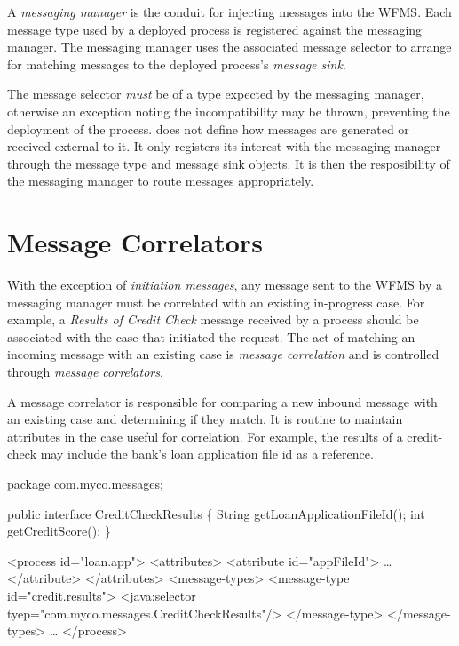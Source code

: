 A \emph{messaging manager} is the conduit for injecting
messages into the WFMS.  Each message type used by a deployed
process is registered against the messaging manager.  The
messaging manager uses the associated message selector to
arrange for matching messages to the deployed process's
\emph{message sink}.

The message selector \emph{must} be of a type expected
by the messaging manager, otherwise an exception noting the
incompatibility may be thrown, preventing the deployment
of the process.  {\werkflow} does not define how messages
are generated or received external to it.  It only registers
its interest with the messaging manager through the message
type and message sink objects.  It is then the resposibility
of the messaging manager to route messages appropriately.

\section{Message Correlators}

With the exception of \emph{initiation messages}, 
any message sent to the WFMS by a messaging manager must
be correlated with an existing in-progress case.  For example,
a \emph{Results of Credit Check} message received
by a process should be associated with the case that initiated
the request.  The act of matching an incoming message with
an existing case is \emph{message correlation} and is
controlled through \emph{message correlators}.

A message correlator is responsible for comparing a new
inbound message with an existing case and determining if
they match.  It is routine to maintain attributes in the
case useful for correlation.  For example, the results of
a credit-check may include the bank's loan application file 
id as a reference.  

\begin{codelisting}
package com.myco.messages;

public interface CreditCheckResults
\{
    String getLoanApplicationFileId();
    int getCreditScore();
\}
\end{codelisting}

\begin{codelisting}
<process id="loan.app">
    <attributes>
        <attribute id="appFileId">
            \dots
        </attribute>
    </attributes>
    <message-types>
        <message-type id="credit.results">
            <java:selector tyep="com.myco.messages.CreditCheckResults"/>
        </message-type>
    </message-types>
    \dots
</process>
\end{codelisting}

